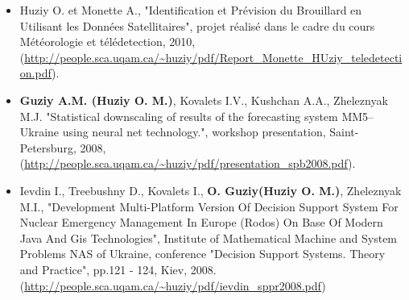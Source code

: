 \documentclass[12pt,a4paper,sans]{moderncv}
\begin{document}
\begin{itemize}
    \item Huziy O. et Monette A., "Identification et Prévision du
    Brouillard en Utilisant les Données Satellitaires", projet réalisé dans le cadre du cours Météorologie et télédetection,
       2010, (\url{http://people.sca.uqam.ca/~huziy/pdf/Report_Monette_HUziy_teledetection.pdf}).

    \item \textbf{Guziy A.M. (Huziy O. M.)}, Kovalets I.V., Kushchan A.A.,
    Zheleznyak M.J.
    "Statistical downscaling of results of the forecasting system MM5–Ukraine using neural net technology.",
    workshop presentation, Saint-Petersburg, 2008, (\url{http://people.sca.uqam.ca/~huziy/pdf/presentation_spb2008.pdf}).

    \item Ievdin I., Treebushny D., Kovalets I., \textbf{O. Guziy(Huziy O.
    M.)}, Zheleznyak M.I., "Development Multi-Platform Version Of Decision
    Support System For Nuclear Emergency Management In Europe (Rodos) On Base Of Modern Java And Gis Technologies", 
    Institute of Mathematical Machine and System Problems NAS of Ukraine, conference
    "Decision Support Systems. Theory and Practice", pp.121 - 124, Kiev, 2008.
     (\url{http://people.sca.uqam.ca/~huziy/pdf/ievdin_sppr2008.pdf})

\end{itemize}
\end{document}
